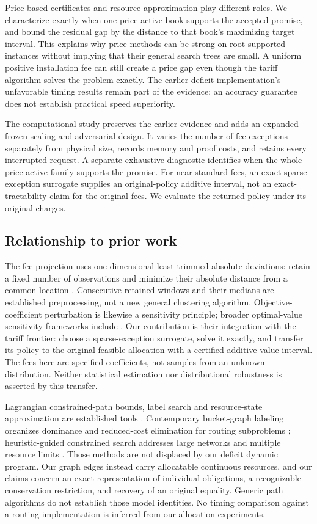 \documentclass[11pt,letterpaper]{article}
\theoremstyle{definition}\newtheorem{remark}[theorem]{Remark}
\begin{document}
Price-based certificates and resource approximation play different roles. We characterize exactly when one price-active book supports the accepted promise, and bound the residual gap by the distance to that book's maximizing target interval. This explains why price methods can be strong on root-supported instances without implying that their general search trees are small. A uniform positive installation fee can still create a price gap even though the tariff algorithm solves the problem exactly. The earlier deficit implementation's unfavorable timing results remain part of the evidence; an accuracy guarantee does not establish practical speed superiority.

The computational study preserves the earlier evidence and adds an expanded frozen scaling and adversarial design. It varies the number of fee exceptions separately from physical size, records memory and proof costs, and retains every interrupted request. A separate exhaustive diagnostic identifies when the whole price-active family supports the promise. For near-standard fees, an exact sparse-exception surrogate supplies an original-policy additive interval, not an exact-tractability claim for the original fees. We evaluate the returned policy under its original charges.

\subsection{Relationship to prior work}
The fee projection uses one-dimensional least trimmed absolute deviations: retain a fixed number of observations and minimize their absolute distance from a common location \citep{Tableman1994,Zioutas2015}. Consecutive retained windows and their medians are established preprocessing, not a new general clustering algorithm. Objective-coefficient perturbation is likewise a sensitivity principle; broader optimal-value sensitivity frameworks include \citet{XuBurer2017}. Our contribution is their integration with the tariff frontier: choose a sparse-exception surrogate, solve it exactly, and transfer its policy to the original feasible allocation with a certified additive value interval. The fees here are specified coefficients, not samples from an unknown distribution. Neither statistical estimation nor distributional robustness is asserted by this transfer.

Lagrangian constrained-path bounds, label search and resource-state approximation are established tools \citep{HandlerZang1980,BeasleyChristofides1989,Fisher1981,Hassin1992,LorenzRaz2001,PuglieseGuerriero2013}. Contemporary bucket-graph labeling organizes dominance and reduced-cost elimination for routing subproblems \citep{Sadykov2021}; heuristic-guided constrained search addresses large networks and multiple resource limits \citep{Ahmadi2025}. Those methods are not displaced by our deficit dynamic program. Our graph edges instead carry allocatable continuous resources, and our claims concern an exact representation of individual obligations, a recognizable conservation restriction, and recovery of an original equality. Generic path algorithms do not establish those model identities. No timing comparison against a routing implementation is inferred from our allocation experiments.
\end{document}
